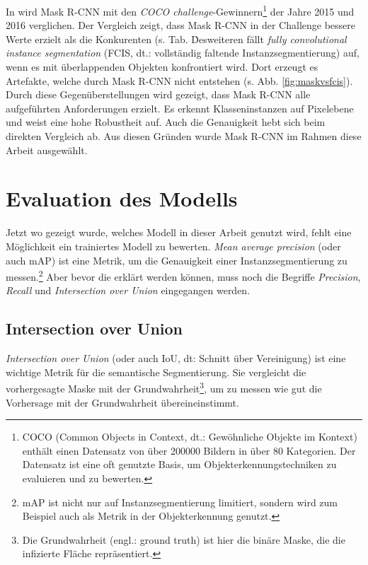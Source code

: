 \noindent
In \cite{ref:maskrcnn} wird Mask R-CNN mit den \textit{COCO challenge}-Gewinnern\footnote{COCO (Common Objects in Context, dt.: Gewöhnliche Objekte im Kontext) enthält einen Datensatz von über 200000 Bildern in über 80 Kategorien. Der Datensatz ist eine oft genutzte Basis, um Objekterkennungstechniken zu evaluieren und zu bewerten.\cite{ref:coco}} der Jahre 2015 und 2016 verglichen. Der Vergleich zeigt, dass Mask R-CNN in der Challenge bessere Werte erzielt als die Konkurenten (s. Tab. \. Desweiteren fällt \textit{fully convolutional instance segmentation} (FCIS, dt.: vollständig faltende Instanzsegmentierung) auf, wenn es mit überlappenden Objekten konfrontiert wird. Dort erzeugt es Artefakte, welche durch Mask R-CNN nicht entstehen (s. Abb. \ref{fig:maskvsfcis}). Durch diese Gegenüberstellungen wird gezeigt, dass Mask R-CNN alle aufgeführten Anforderungen erzielt. Es erkennt Klasseninstanzen auf Pixelebene und weist eine hohe Robustheit auf. Auch die Genauigkeit hebt sich beim direkten Vergleich ab. Aus diesen Gründen wurde Mask R-CNN im Rahmen diese Arbeit ausgewählt.

\section{Evaluation des Modells}\label{sec:map}

Jetzt wo gezeigt wurde, welches Modell in dieser Arbeit genutzt wird, fehlt eine Möglichkeit ein trainiertes Modell zu bewerten. \textit{Mean average precision} (oder auch mAP) ist eine Metrik, um die Genauigkeit einer Instanzsegmentierung zu messen.\footnote{mAP ist nicht nur auf Instanzsegmentierung limitiert, sondern wird zum Beispiel auch als Metrik in der Objekterkennung genutzt.} Aber bevor die erklärt werden können, muss noch die Begriffe \textit{Precision}, \textit{Recall} und \textit{Intersection over Union} eingegangen werden. 


\subsection{Intersection over Union}

\textit{Intersection over Union} (oder auch IoU, dt: Schnitt über Vereinigung) ist eine wichtige Metrik für die semantische Segmentierung. Sie vergleicht die vorhergesagte Maske mit der Grundwahrheit\footnote{Die Grundwahrheit (engl.: ground truth) ist hier die binäre Maske, die die infizierte Fläche repräsentiert.}, um zu messen wie gut die Vorhersage mit der Grundwahrheit übereineinstimmt.\cite{ref:map}

